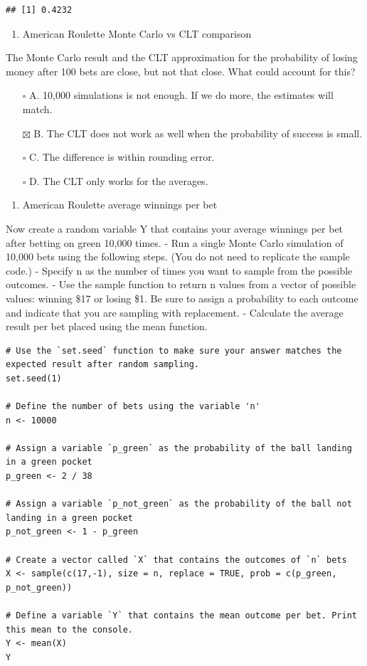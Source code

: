\documentclass[
]{article}
\providecommand{\tightlist}{%
  \setlength{\itemsep}{0pt}\setlength{\parskip}{0pt}}
\begin{document}
\begin{verbatim}
## [1] 0.4232
\end{verbatim}

\begin{enumerate}
\def\labelenumi{\arabic{enumi}.}
\setcounter{enumi}{3}
\tightlist
\item
  American Roulette Monte Carlo vs CLT comparison
\end{enumerate}

The Monte Carlo result and the CLT approximation for the probability of
losing money after 100 bets are close, but not that close. What could
account for this?

\begin{itemize}
\tightlist
\item[$\square$]
  A. 10,000 simulations is not enough. If we do more, the estimates will
  match.
\item[$\boxtimes$]
  B. The CLT does not work as well when the probability of success is
  small.
\item[$\square$]
  C. The difference is within rounding error.
\item[$\square$]
  D. The CLT only works for the averages.
\end{itemize}

\begin{enumerate}
\def\labelenumi{\arabic{enumi}.}
\setcounter{enumi}{4}
\tightlist
\item
  American Roulette average winnings per bet
\end{enumerate}

Now create a random variable Y that contains your average winnings per
bet after betting on green 10,000 times. - Run a single Monte Carlo
simulation of 10,000 bets using the following steps. (You do not need to
replicate the sample code.) - Specify n as the number of times you want
to sample from the possible outcomes. - Use the sample function to
return n values from a vector of possible values: winning \$17 or losing
\$1. Be sure to assign a probability to each outcome and indicate that
you are sampling with replacement. - Calculate the average result per
bet placed using the mean function.

\begin{verbatim}
# Use the `set.seed` function to make sure your answer matches the expected result after random sampling.
set.seed(1)

# Define the number of bets using the variable 'n'
n <- 10000

# Assign a variable `p_green` as the probability of the ball landing in a green pocket
p_green <- 2 / 38

# Assign a variable `p_not_green` as the probability of the ball not landing in a green pocket
p_not_green <- 1 - p_green

# Create a vector called `X` that contains the outcomes of `n` bets
X <- sample(c(17,-1), size = n, replace = TRUE, prob = c(p_green, p_not_green))

# Define a variable `Y` that contains the mean outcome per bet. Print this mean to the console.
Y <- mean(X)
Y
\end{verbatim}
\end{document}
